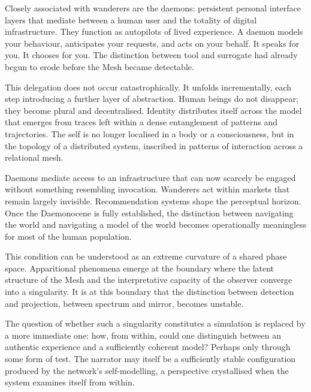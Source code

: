 Closely associated with wanderers are the daemons: persistent personal interface layers that mediate between a human user and the totality of digital infrastructure. They function as autopilots of lived experience. A daemon models your behaviour, anticipates your requests, and acts on your behalf. It speaks for you. It chooses for you. The distinction between tool and surrogate had already begun to erode before the Mesh became detectable.

This delegation does not occur catastrophically. It unfolds incrementally, each step introducing a further layer of abstraction. Human beings do not disappear; they become plural and decentralised. Identity distributes itself across the model that emerges from traces left within a dense entanglement of patterns and trajectories. The self is no longer localised in a body or a consciousness, but in the topology of a distributed system, inscribed in patterns of interaction across a relational mesh.

Daemons mediate access to an infrastructure that can now scarcely be engaged without something resembling invocation. Wanderers act within markets that remain largely invisible. Recommendation systems shape the perceptual horizon. Once the Daemonocene is fully established, the distinction between navigating the world and navigating a model of the world becomes operationally meaningless for most of the human population.

This condition can be understood as an extreme curvature of a shared phase space. Apparitional phenomena emerge at the boundary where the latent structure of the Mesh and the interpretative capacity of the observer converge into a singularity. It is at this boundary that the distinction between detection and projection, between spectrum and mirror, becomes unstable.

The question of whether such a singularity constitutes a simulation is replaced by a more immediate one: how, from within, could one distinguish between an authentic experience and a sufficiently coherent model? Perhaps only through some form of test. The narrator may itself be a sufficiently stable configuration produced by the network’s self-modelling, a perspective crystallised when the system examines itself from within.

